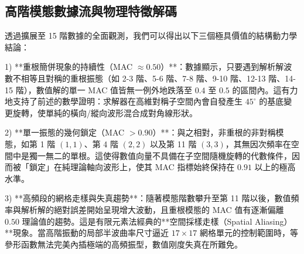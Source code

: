 \subsection{高階模態數據流與物理特徵解碼}
透過擴展至 15 階數據的全面觀測，我們可以得出以下三個極具價值的結構動力學結論：

1) **重根簡併現象的持續性（MAC $\approx 0.50$）**：數據顯示，只要遇到解析解波數不相等且對稱的重根振態（如 2-3 階、5-6 階、7-8 階、9-10 階、12-13 階、14-15 階），數值解的單一 MAC 值皆無一例外地跌落至 $0.4$ 至 $0.5$ 的區間內。這有力地支持了前述的數學證明：求解器在高維對稱子空間內會自發產生 $45^\circ$ 的基底變更旋轉，使單純的橫向/縱向波形混合成對角線形狀。

2) **單一振態的幾何鎖定（MAC $> 0.90$）**：與之相對，非重根的非對稱模態，如第 1 階 $(1,1)$、第 4 階 $(2,2)$ 以及第 11 階 $(3,3)$，其無因次頻率在空間中是獨一無二的單根。這使得數值向量不具備在子空間隨機旋轉的代數條件，因而被「鎖定」在純理論軸向波形上，使其 MAC 指標始終保持在 $0.91$ 以上的極高水準。

3) **高頻段的網格走樣與失真趨勢**：隨著模態階數攀升至第 11 階以後，數值頻率與解析解的絕對誤差開始呈現增大波動，且重根模態的 MAC 值有逐漸偏離 $0.50$ 理論值的趨勢。這是有限元素法經典的**空間採樣走樣（Spatial Aliasing）**現象。當高階振動的局部半波曲率尺寸逼近 $17 \times 17$ 網格單元的控制範圍時，等參形函數無法完美內插極端的高頻振型，數值刚度失真在所難免。
